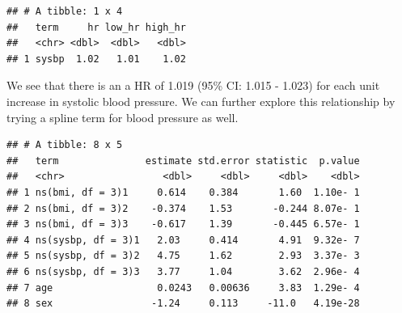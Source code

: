 \documentclass[
]{book}
\newenvironment{Shaded}{\begin{snugshade}}{\end{snugshade}}
\newcommand{\DataTypeTok}[1]{\textcolor[rgb]{0.13,0.29,0.53}{#1}}
\newcommand{\DecValTok}[1]{\textcolor[rgb]{0.00,0.00,0.81}{#1}}
\newcommand{\KeywordTok}[1]{\textcolor[rgb]{0.13,0.29,0.53}{\textbf{#1}}}
\newcommand{\NormalTok}[1]{#1}
\newcommand{\OperatorTok}[1]{\textcolor[rgb]{0.81,0.36,0.00}{\textbf{#1}}}
\newcommand{\StringTok}[1]{\textcolor[rgb]{0.31,0.60,0.02}{#1}}
\begin{document}
\begin{verbatim}
## # A tibble: 1 x 4
##   term     hr low_hr high_hr
##   <chr> <dbl>  <dbl>   <dbl>
## 1 sysbp  1.02   1.01    1.02
\end{verbatim}

We see that there is an a HR of 1.019 (95\% CI: 1.015 - 1.023) for each unit increase in systolic blood pressure. We can further explore this relationship by trying a spline term for blood pressure as well.

\begin{Shaded}
\end{Shaded}

\begin{verbatim}
## # A tibble: 8 x 5
##   term               estimate std.error statistic  p.value
##   <chr>                 <dbl>     <dbl>     <dbl>    <dbl>
## 1 ns(bmi, df = 3)1     0.614    0.384       1.60  1.10e- 1
## 2 ns(bmi, df = 3)2    -0.374    1.53       -0.244 8.07e- 1
## 3 ns(bmi, df = 3)3    -0.617    1.39       -0.445 6.57e- 1
## 4 ns(sysbp, df = 3)1   2.03     0.414       4.91  9.32e- 7
## 5 ns(sysbp, df = 3)2   4.75     1.62        2.93  3.37e- 3
## 6 ns(sysbp, df = 3)3   3.77     1.04        3.62  2.96e- 4
## 7 age                  0.0243   0.00636     3.83  1.29e- 4
## 8 sex                 -1.24     0.113     -11.0   4.19e-28
\end{verbatim}
\end{document}
